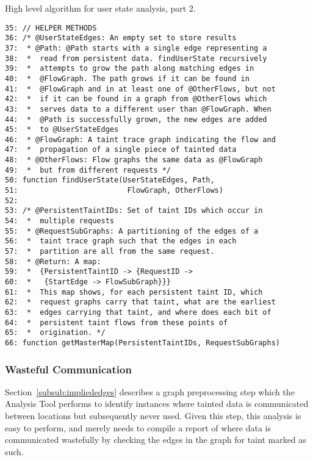 \documentclass[msc,oneside]{ubcthesis}
\begin{document}
\begin{Program}
  \caption{\label{prog:code5part2} High level algorithm for user state analysis, part 2.}
\begin{verbatim}
35: // HELPER METHODS
36: /* @UserStateEdges: An empty set to store results
37:  * @Path: @Path starts with a single edge representing a 
38:  *  read from persistent data. findUserState recursively 
39:  *  attempts to grow the path along matching edges in 
40:  *  @FlowGraph. The path grows if it can be found in 
41:  *  @FlowGraph and in at least one of @OtherFlows, but not
42:  *  if it can be found in a graph from @OtherFlows which 
43:  *  serves data to a different user than @FlowGraph. When
44:  *  @Path is successfully grown, the new edges are added 
45:  *  to @UserStateEdges
46:  * @FlowGraph: A taint trace graph indicating the flow and
47:  *  propagation of a single piece of tainted data
48:  * @OtherFlows: Flow graphs the same data as @FlowGraph 
49:  *  but from different requests */
50: function findUserState(UserStateEdges, Path, 
51:                         FlowGraph, OtherFlows)
52: 
53: /* @PersistentTaintIDs: Set of taint IDs which occur in 
54:  *  multiple requests
55:  * @RequestSubGraphs: A partitioning of the edges of a
56:  *  taint trace graph such that the edges in each 
57:  *  partition are all from the same request. 
58:  * @Return: A map: 
59:  *  {PersistentTaintID -> {RequestID -> 
60:  *   {StartEdge -> FlowSubGraph}}}
61:  *  This map shows, for each persistent taint ID, which 
62:  *  request graphs carry that taint, what are the earliest
63:  *  edges carrying that taint, and where does each bit of 
64:  *  persistent taint flows from these points of 
65:  *  origination. */
66: function getMasterMap(PersistentTaintIDs, RequestSubGraphs)   
\end{verbatim}
\end{Program}

\subsubsection{Wasteful Communication}
Section~\ref{subsub:impliededges} describes a graph preprocessing step which the Analysis Tool performs to identify instances where tainted data is communicated between locations but subsequently never used. Given this step, this analysis is easy to perform, and merely needs to compile a report of where data is communicated wastefully by checking the edges in the graph for taint marked as such. \\
\end{document}
